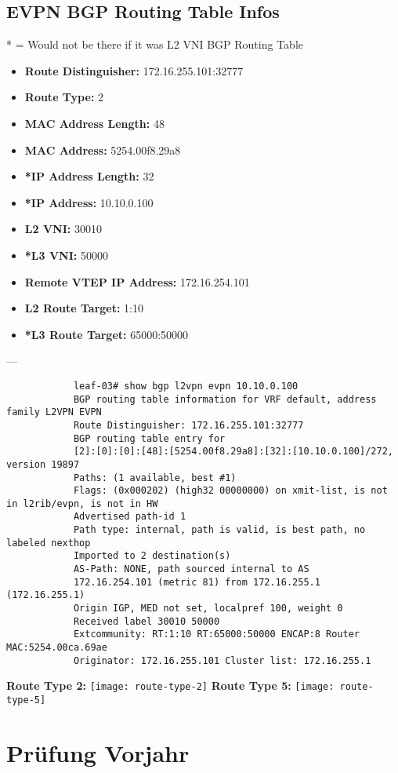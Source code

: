 \begin{multicols*}{5}
		\subsection{EVPN BGP Routing Table Infos}
		* = Would not be there if it was L2 VNI BGP Routing Table
		\begin{itemize}
			\item \textbf{Route Distinguisher:} 172.16.255.101:32777
			\item \textbf{Route Type:} 2
			\item \textbf{MAC Address Length:} 48
			\item \textbf{MAC Address:} 5254.00f8.29a8
			\item \textbf{*IP Address Length:} 32
			\item \textbf{*IP Address:} 10.10.0.100
			\item \textbf{L2 VNI:} 30010
			\item \textbf{*L3 VNI:} 50000
			\item \textbf{Remote VTEP IP Address:} 172.16.254.101
			\item \textbf{L2 Route Target:} 1:10
			\item \textbf{*L3 Route Target:} 65000:50000
		\end{itemize}
		---
		\begin{lstlisting}
			leaf-03# show bgp l2vpn evpn 10.10.0.100
			BGP routing table information for VRF default, address family L2VPN EVPN
			Route Distinguisher: 172.16.255.101:32777
			BGP routing table entry for
			[2]:[0]:[0]:[48]:[5254.00f8.29a8]:[32]:[10.10.0.100]/272, version 19897
			Paths: (1 available, best #1)
			Flags: (0x000202) (high32 00000000) on xmit-list, is not in l2rib/evpn, is not in HW
			Advertised path-id 1
			Path type: internal, path is valid, is best path, no labeled nexthop
			Imported to 2 destination(s)
			AS-Path: NONE, path sourced internal to AS
			172.16.254.101 (metric 81) from 172.16.255.1 (172.16.255.1)
			Origin IGP, MED not set, localpref 100, weight 0
			Received label 30010 50000
			Extcommunity: RT:1:10 RT:65000:50000 ENCAP:8 Router MAC:5254.00ca.69ae
			Originator: 172.16.255.101 Cluster list: 172.16.255.1
		\end{lstlisting}
		
		\begin{center}
			\textbf{Route Type 2:}
			\texttt{[image: route-type-2]}
			\textbf{Route Type 5:}
			\texttt{[image: route-type-5]}
		\end{center}
		\section{Prüfung Vorjahr}

\end{multicols*}
